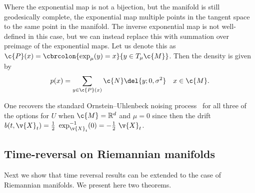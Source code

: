 Where the exponential map is not a bijection, but the manifold is still geodesically complete, the exponential map multiple points in the tangent space to the same point in the manifold.
The inverse exponential map is not well-defined in this case, but we can instead replace this with summation over preimage of the exponential maps.
Let us denote this as \(\c{P}(x) = \cbrcolon{\exp_\mu(y) = x}{y\in T_\mu \c{M}}\).
Then the density is given by
\[p(x) = \sum_{y \in \c{P}(x)}\c{N}\del{y;0, \sigma^2} \quad x\in \c{M}.\]

One recovers the standard Ornstein--Uhlenbeck noising process~\parencite{song2020score} for all three of the options for \(U\) when \(\c{M}=\R^d\) and \(\mu = 0\) since then the drift \(b(t, \v{X}_t) = \tfrac{1}{2} ~\exp^{-1}_{\v{X}_t}(0) = -\tfrac{1}{2}~\v{X}_t\).

\subsection{Time-reversal on Riemannian manifolds}
\label{sec:manifold_time_reversal}
Next we show that time reversal results can be extended to the case of Riemannian manifolds.
We present here two theorems.

